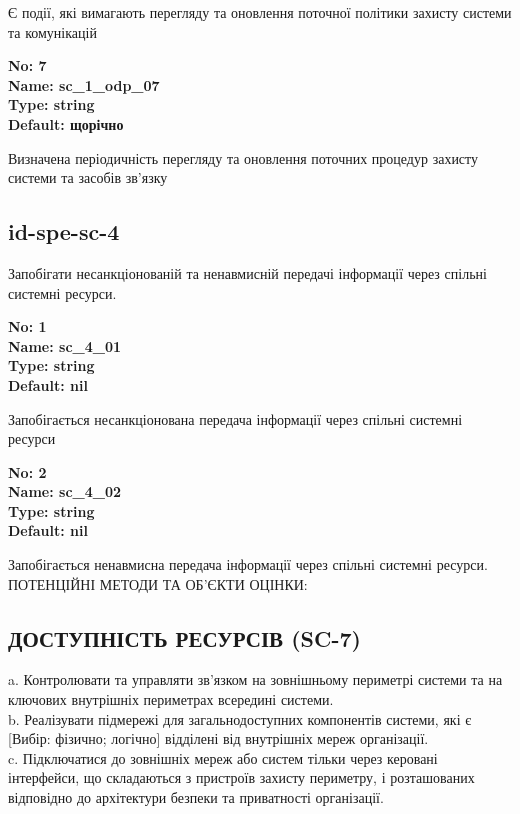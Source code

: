 \documentclass{article}
\begin{document}
{\footnotesize Є події, які вимагають перегляду та оновлення поточної політики захисту системи та комунікацій}


{\footnotesize\bfseries
No: 7\\
Name: sc\_\allowbreak{}1\_\allowbreak{}odp\_\allowbreak{}07\\
Type: string\\
Default: \textquotedbl{}щорічно\textquotedbl{}
}

{\footnotesize Визначена періодичність перегляду та оновлення поточних процедур захисту системи та засобів зв'язку}




\subsection{id-spe-sc-4}
Запобігати несанкціонованій та ненавмисній передачі інформації через спільні системні ресурси.

\vspace{10pt}
{\footnotesize\bfseries
No: 1\\
Name: sc\_\allowbreak{}4\_\allowbreak{}01\\
Type: string\\
Default: nil
}

{\footnotesize Запобігається несанкціонована передача інформації через спільні системні ресурси}


{\footnotesize\bfseries
No: 2\\
Name: sc\_\allowbreak{}4\_\allowbreak{}02\\
Type: string\\
Default: nil
}

{\footnotesize Запобігається ненавмисна передача інформації через спільні системні ресурси. ПОТЕНЦІЙНІ МЕТОДИ ТА ОБ'ЄКТИ ОЦІНКИ:}




\subsection{ДОСТУПНІСТЬ РЕСУРСІВ (SC-7)}
a. Контролювати та управляти зв'язком на зовнішньому периметрі системи та на ключових внутрішніх периметрах всередині системи.\\ 
b. Реалізувати підмережі для загальнодоступних компонентів системи, які є [Вибір: фізично; логічно] відділені від внутрішніх мереж організації.\\ 
c. Підключатися до зовнішніх мереж або систем тільки через керовані інтерфейси, що складаються з пристроїв захисту периметру, і розташованих відповідно до архітектури безпеки та приватності організації.
\end{document}
